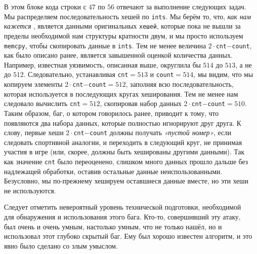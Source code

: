 \documentclass{mrl}
\begin{document}
В этом блоке кода строки с $47$ по $56$ отвечают за выполнение следующих задач. Мы распределяем последовательность хешей по \texttt{ints}. Мы берём то, что, \emph{как нам кажется} , является данными оригинальных \texttt{хешей}, которые пока не вышли за пределы необходимой нам структуры кратности двум, и мы просто используем \texttt{memcpy}, чтобы скопировать данные в \texttt{ints}. Тем не менее величина \texttt{$2\cdot$cnt$-$count}, как было описано ранее, является завышенной оценкой количества данных. Например, известная уязвимость, описанная выше, округлила бы $514$ до $513$, а не до $512$. Следовательно, устанавливая \texttt{cnt$=513$} и \texttt{count$=514$}, мы видим, что мы копируем элементы \texttt{$2\cdot$cnt$-$count$=512$}, заполняя всю последовательность, которая используется в последующих кругах хеширования. Тем не менее нам следовало вычислить \texttt{cnt$=512$}, скопировав набор данных \texttt{$2\cdot$cnt$-$count$=510$}. Таким образом, баг, о котором говорилось ранее, приводит к тому, что появляются два набора данных, которые полностью игнорируют друг друга. К слову, первые хеши \texttt{$2\cdot$cnt$-$count} должны получать \emph{«пустой номер»}, если следовать спортивной аналогии, и переходить в следующий круг, не принимая участия в игре (или, скорее, должны быть хешированы другими данными). Так как значение \texttt{cnt} было переоценено, слишком много данных прошло дальше без надлежащей обработки, оставив остальные данные неиспользованными. Безусловно, мы по-прежнему хешируем оставшиеся данные вместе, но эти хеши не используются.

Следует отметить невероятный уровень технической подготовки, необходимой для обнаружения и использования этого бага. Кто-то, совершивший эту атаку, был очень и очень умным, настолько умным, что не только нашёл, но и использовал этот глубоко скрытый баг. Ему был хорошо известен алгоритм, и это явно было сделано со злым умыслом.
\end{document}
